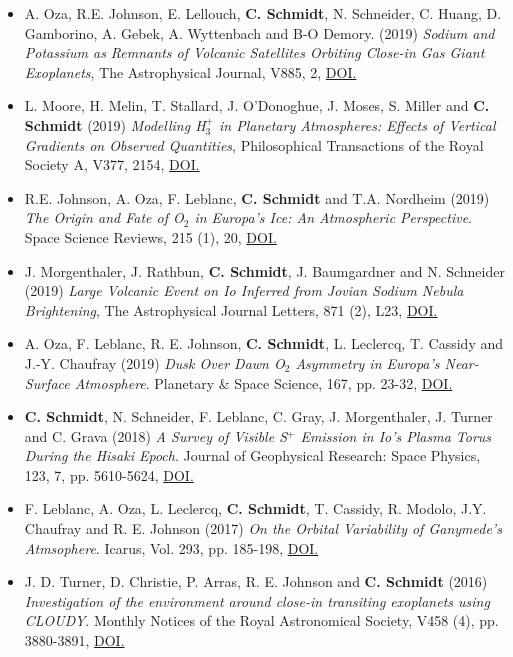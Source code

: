 \documentclass[12pt]{report}
\begin{document}
\begin{itemize}
  \item A. Oza, R.E. Johnson, E. Lellouch, \textbf{C. Schmidt}, N. Schneider, C. Huang, D. Gamborino, A. Gebek, A. Wyttenbach and B-O Demory. (2019) \textit{Sodium and Potassium as Remnants of Volcanic Satellites Orbiting Close-in Gas Giant Exoplanets}, The Astrophysical Journal, V885, 2, \href{https://doi.org/10.3847/1538-4357/ab40cc}{DOI.}
  \item L. Moore, H. Melin, T. Stallard, J. O'Donoghue, J. Moses, S. Miller and \textbf{C. Schmidt} (2019) \textit{Modelling H$_3^+$ in Planetary Atmospheres: Effects of Vertical Gradients on Observed Quantities}, Philosophical Transactions of the Royal Society A, V377, 2154, \href{https://doi.org/10.1098/rsta.2019.0067}{DOI.}
  \item R.E. Johnson, A. Oza, F. Leblanc,  \textbf{C. Schmidt} and T.A. Nordheim (2019) \textit{The Origin and Fate of O$_2$ in Europa's Ice: An Atmospheric Perspective}. Space Science Reviews, 215 (1), 20, \href{https://doi.org/10.1007/s11214-019-0582-1}{DOI.}
  \item J. Morgenthaler, J. Rathbun, \textbf{C. Schmidt}, J. Baumgardner and N. Schneider (2019) \textit{Large Volcanic Event on Io Inferred from Jovian Sodium Nebula Brightening}, The Astrophysical Journal Letters, 871 (2), L23, \href{https://doi.org/10.3847/2041-8213/aafdb7}{DOI.}
  \item A. Oza, F. Leblanc, R. E. Johnson, \textbf{C. Schmidt}, L. Leclercq, T. Cassidy and J.-Y. Chaufray (2019) \textit{Dusk Over Dawn O$_2$ Asymmetry in Europa's Near-Surface Atmosphere}. Planetary \& Space Science, 167, pp. 23-32, \href{https://doi.org/10.1016/j.pss.2019.01.006}{DOI.}
  \item \textbf{C. Schmidt}, N. Schneider, F. Leblanc, C. Gray, J. Morgenthaler, J. Turner and C. Grava (2018) \textit{A Survey of Visible S$^+$ Emission in Io's Plasma Torus During the Hisaki Epoch}. Journal of Geophysical Research: Space Physics, 123, 7, pp. 5610-5624, \href{https://doi.org/10.1029/2018JA025296}{DOI.}
  \item F. Leblanc, A. Oza, L. Leclercq, \textbf{C. Schmidt}, T. Cassidy, R. Modolo, J.Y. Chaufray and R. E. Johnson (2017) \textit{On the Orbital Variability of Ganymede's Atmsophere}. Icarus, Vol. 293, pp. 185-198, \href{doi.org/10.1016/j.icarus.2017.04.025}{DOI.}
  \item J. D. Turner, D. Christie, P. Arras, R. E. Johnson and \textbf{C. Schmidt} (2016) \textit{Investigation of the environment around close-in transiting exoplanets using CLOUDY}. Monthly Notices of the Royal Astronomical Society, V458 (4), pp. 3880-3891, \href{https://doi.org/10.1093/mnras/stw556}{DOI.}

\end{itemize}
\end{document}
